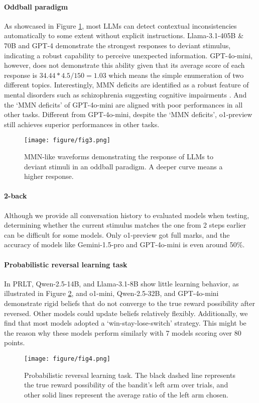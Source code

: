 \paragraph{Oddball paradigm} As showcased in Figure \ref{fig3}, most LLMs can detect contextual inconsistencies automatically to some extent without explicit instructions. Llama-3.1-405B \& 70B and GPT-4 demonstrate the strongest responses to deviant stimulus, indicating a robust capability to perceive unexpected information. GPT-4o-mini, however, does not demonstrate this ability given that its average score of each response is \(34.44 * 4.5 / 150 = 1.03\) which means the simple enumeration of two different topics. Interestingly, MMN deficits are identified as a robust feature of mental disorders such as schizophrenia suggesting cognitive impairments \cite{umbricht2005mismatch}. And the `MMN deficits' of GPT-4o-mini are aligned with poor performances in all other tasks. Different from GPT-4o-mini, despite the `MMN deficits', o1-preview still achieves superior performances in other tasks.
\begin{figure}
    \centering
    \texttt{[image: figure/fig3.png]}
    \caption{MMN-like waveforms demonstrating the response of LLMs to deviant stimuli in an oddball paradigm. A deeper curve means a higher response.}
    \label{fig3}
\end{figure}
\paragraph{2-back} Although we provide all conversation history to evaluated models when testing, determining whether the current stimulus matches the one from 2 steps earlier can be difficult for some models. Only o1-preview got full marks, and the accuracy of models like Gemini-1.5-pro and GPT-4o-mini is even around 50\%.

\paragraph{Probabilistic reversal learning task} In PRLT, Qwen-2.5-14B, and Llama-3.1-8B show little learning behavior, as illustrated in Figure \ref{fig4}, and o1-mini, Qwen-2.5-32B, and GPT-4o-mini demonstrate rigid beliefs that do not converge to the true reward possibility after reversed. Other models could update beliefs relatively flexibly. Additionally, we find that most models adopted a `win-stay-lose-switch' strategy. This might be the reason why these models perform similarly with 7 models scoring over 80 points.
\begin{figure}
    \centering
    \texttt{[image: figure/fig4.png]}
    \caption{Probabilistic reversal learning task. The black dashed line represents the true reward possibility of the bandit's left arm over trials, and other solid lines represent the average ratio of the left arm chosen. }
    \label{fig4}
\end{figure}
